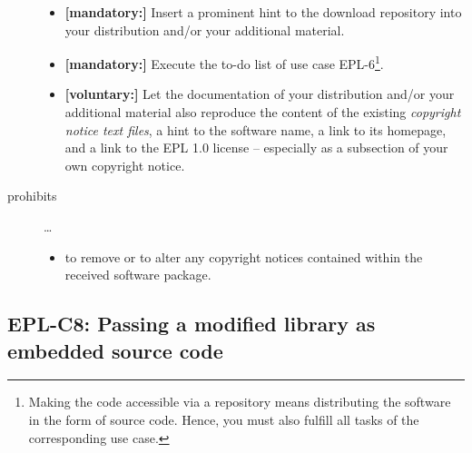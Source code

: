 \begin{description}
\begin{itemize}
  \item \textbf{[mandatory:]} Insert a prominent hint to the download repository
  into your distribution and/or your additional material.
  
  \item \textbf{[mandatory:]} Execute the to-do list of use case EPL-6\footnote{
  Making the code accessible via a repository means distributing the software in
  the form of source code. Hence, you must also fulfill all tasks of the
  corresponding use case.}.
  
 
  \item \textbf{[voluntary:]} Let the documentation of your distribution and/or
  your additional material  also reproduce the content of the existing
  \emph{copyright notice text files}, a hint to the software name, a link to its
  homepage, and a link to the EPL 1.0 license -- especially as a subsection of
  your own copyright notice.
  
\end{itemize}

\item[prohibits] \ldots
\begin{itemize}
  \item to remove or to alter any copyright notices contained within the
  received software package.
\end{itemize}

\end{description}

\subsection{EPL-C8: Passing a modified library as embedded source code}
\label{OSUC-10S-EPL}

